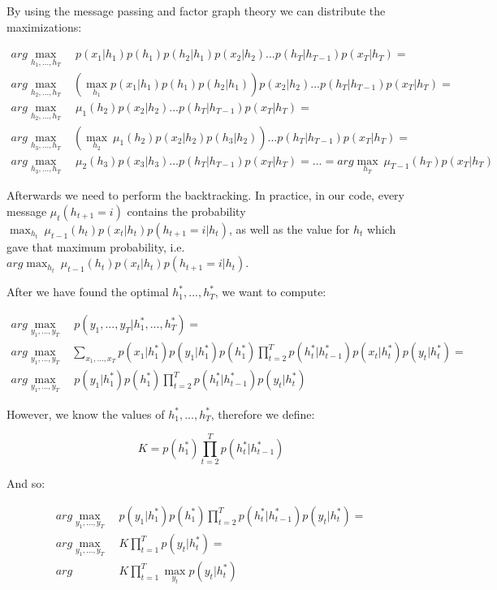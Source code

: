\documentclass[11pt,a4paper,oneside]{report}
\begin{document}
By using the message passing and factor graph theory we can distribute the maximizations:

\begin{align*}
arg\max_{h_1,...,h_T}&\ p(x_1|h_1)p(h_1)p(h_2|h_1)p(x_2|h_2)...p(h_T|h_{T-1})p(x_T|h_T)=\\	
arg\max_{h_2,...,h_T}&\left(\max_{h_1} p(x_1|h_1)p(h_1)p(h_2|h_1)\right)p(x_2|h_2)...p(h_T|h_{T-1})p(x_T|h_T)=\\
arg\max_{h_2,...,h_T}&\ \mu_1(h_2)p(x_2|h_2)...p(h_T|h_{T-1})p(x_T|h_T)=\\
arg\max_{h_3,...,h_T}&\left(\max_{h_2}\ \mu_1(h_2)p(x_2|h_2)p(h_3|h_2)\right)...p(h_T|h_{T-1})p(x_T|h_T)=\\
arg\max_{h_3,...,h_T}&\ \mu_2(h_3)p(x_3|h_3)...p(h_T|h_{T-1})p(x_T|h_T)=...=arg\max_{h_T}\ \mu_{T-1}(h_T)p(x_T|h_T)
\end{align*}

Afterwards we need to perform the backtracking. In practice, in our code, every message $\mu_t(h_{t+1} = i)$ contains the probability $\max_{h_t}\ \mu_{t-1}(h_t)p(x_t|h_t)p(h_{t+1}=i|h_t)$, as well as the value for $h_t$ which gave that maximum probability, i.e. $arg\max_{h_t}\ \mu_{t-1}(h_t)p(x_t|h_t)p(h_{t+1}=i|h_t)$.

After we have found the optimal $h_1^\ast,...,h_T^\ast$, we want to compute:

\begin{align*}
arg\max_{y_1,...,y_T}&\ p(y_1,...,y_T|h_1^\ast,...,h_T^\ast)=\\
arg\max_{y_1,...,y_T}&\sum_{x_1,...,x_T}p(x_1|h_1^\ast)p(y_1|h_1^\ast)p(h_1^\ast)\prod_{t=2}^Tp(h_t^\ast|h_{t-1}^\ast)p(x_t|h_t^\ast)p(y_t|h_t^\ast)=\\
arg\max_{y_1,...,y_T}&\ p(y_1|h_1^\ast)p(h_1^\ast)\prod_{t=2}^Tp(h_t^\ast|h_{t-1}^\ast)p(y_t|h_t^\ast)
\end{align*}

However, we know the values of $h_1^\ast,...,h_T^\ast$, therefore we define:

$$K = p(h_1^\ast)\prod_{t=2}^Tp(h_t^\ast|h_{t-1}^\ast)$$

And so:

\begin{align*}
arg\max_{y_1,...,y_T}&\ p(y_1|h_1^\ast)p(h_1^\ast)\prod_{t=2}^Tp(h_t^\ast|h_{t-1}^\ast)p(y_t|h_t^\ast)=\\
arg\max_{y_1,...,y_T}&\ K\prod_{t=1}^Tp(y_t|h_t^\ast)=\\
arg&\ K\prod_{t=1}^T\max_{y_t}p(y_t|h_t^\ast)
\end{align*}
\end{document}
